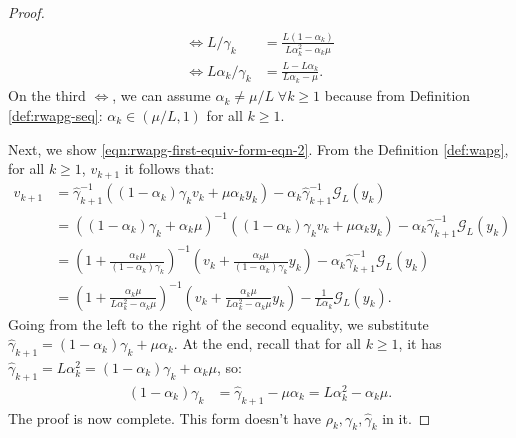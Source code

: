 \documentclass[12pt]{article}
\begin{document}
\begin{proof}
\begin{align*}
                \\
                \iff
                L/\gamma_k
                &=
                \frac{L (1 - \alpha_k)}{L \alpha_k^2 - \alpha_k\mu}
                \\
                \iff
                L\alpha_k/\gamma_k
                &=
                \frac{L - L\alpha_k}{L\alpha_k - \mu}.
            \end{align*}
            On the third $\iff$, we can assume $\alpha_k \neq \mu/L\;  \forall k \ge 1$ because from Definition \ref{def:rwapg-seq}: $\alpha_k \in (\mu/L, 1)$ for all $k \ge 1$.
            \par
            {Next, we show \eqref{eqn:rwapg-first-equiv-form-eqn-2}.}
            From the Definition \ref{def:wapg}, for all $k \ge 1$, $v_{k + 1}$ it follows that:
            \begin{align*}
                v_{k + 1} &=
                \hat \gamma_{k + 1}^{-1}
                ((1 - \alpha_k)\gamma_k v_k + \mu\alpha_k y_k)
                - \alpha_k\hat \gamma_{k + 1}^{-1}\mathcal G_L (y_k)
                \\
                &=
                ((1 - \alpha_k)\gamma_k + \alpha_k \mu)^{-1}
                \left(
                    (1 - \alpha_k)\gamma_k v_k + \mu\alpha_k y_k
                \right)
                - \alpha_k\hat \gamma_{k + 1}^{-1}\mathcal G_L (y_k)
                \\
                &=
                \left(
                    1 + \frac{\alpha_k\mu}{(1 - \alpha_k)\gamma_k}
                \right)^{-1}
                \left(
                    v_k +
                    \frac{\alpha_k\mu}{(1 - \alpha_k)\gamma_k} y_k
                \right)
                - \alpha_k\hat \gamma_{k + 1}^{-1}\mathcal G_L (y_k)
                \\
                &=
                \left(
                    1 + \frac{\alpha_k \mu}{L \alpha_k^2 - \alpha_k \mu}
                \right)^{-1}
                \left(
                    v_k +
                    \frac{\alpha_k \mu}{L \alpha_k^2 - \alpha_k \mu} y_k
                \right)
                - \frac{1}{L\alpha_{k}}\mathcal G_L (y_k).
            \end{align*}
            Going from the left to the right of the second equality, we substitute $\hat \gamma_{k + 1} = (1 - \alpha_k)\gamma_k + \mu\alpha_k$.
            At the end, recall that for all $k \ge 1$, it has $\hat \gamma_{k + 1} = L \alpha_k^2 = (1 - \alpha_k)\gamma_k + \alpha_k \mu$, so:
            \begin{align*}
                (1 - \alpha_k)\gamma_k
                &=
                \hat \gamma_{k + 1} - \mu \alpha_k
                =
                L\alpha_{k}^2 - \alpha_k\mu.
            \end{align*}
            The proof is now complete.
            This form doesn't have $\rho_k, \gamma_k, \hat \gamma_k$ in it.
        \end{proof}
\end{document}
